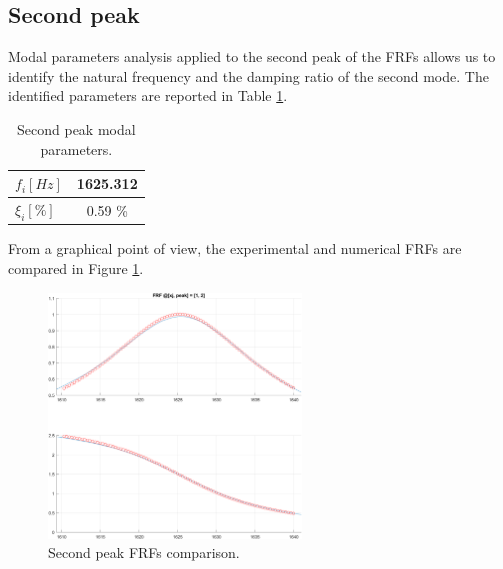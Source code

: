 \subsection{Second peak}
\label{subsec:second_peak}

Modal parameters analysis applied to the second peak of the FRFs allows us to identify the natural frequency and the damping ratio of the second mode.
The identified parameters are reported in Table \ref{tab:second_peak}.

\begin{table}[H]
    \centering
    \begin{tabular}{lc}
        \hline
        $f_i [Hz]$ & 1625.312 \\
        \hline
        $\xi_i [\%]$       & 0.59 \%     \\
        \hline
    \end{tabular}
    \caption{Second peak modal parameters.}
    \label{tab:second_peak}
\end{table}

From a graphical point of view, the experimental and numerical FRFs are compared in Figure \ref{fig:second_peak}.

\begin{figure}[H]
    \centering
    \includegraphics[width=0.6\textwidth]{img/MATLAB/Part_B/Comparison_FRF_1_zoom_peak_02.png}
    \caption{Second peak FRFs comparison.}
    \label{fig:second_peak}
\end{figure}
